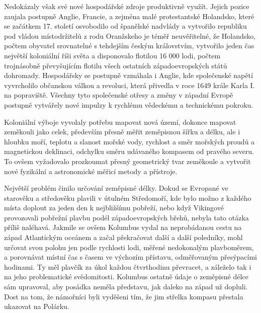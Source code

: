       Nedokázaly však své nové hospodářské zdroje produktivně využít. Jejich pozice zaujala postupně
      Anglie, Francie, a zejména malé protestantské Holandsko, které se začátkem 17. století
      osvobodilo od španělské nadvlády a vytvořilo republiku pod vládou místodržitelů z rodu
      Oranžskeho je téměř neuvěřitelné, že Holandsko, počtem obyvatel srovnatelné s tehdejším českým
      královstvím, vytvořilo jeden čas největší koloniální říši světa a disponovalo flotilou 16 000
      lodi, počtem trojnásobně převyšujícím flotilu všech ostatních západoevropských států
      dohromady. Hospodářsky se postupně vzmáhala i Anglie, kde společenské napětí vyvrcholilo
      občanskou válkou a revoluci, která přivedla v roce 1649 krále Karla I. na popraviště. Všechny
      tyto společenské otřesy a změny v západní Evropě postupně vytvářely nové impulzy k rychlému
      vědeckému a technickému pokroku.

      Koloniální výboje vyvolaly potřebu mapovat nová území, dokonce mapovat zeměkouli jako celek,
      především přesně měřit zeměpisnou šířku a délku, ale i hloubku moří, teplotu a slanost mořské
      vody, rychlost a směr mořských proudů a magnetickou deklinaci, odchylku směru udávaného
      kompasem od pravého severu. To ovšem vyžadovalo prozkoumat přesný geometrický tvar zeměkoule a
      vytvořit nové fyzikální a astronomické měřicí metody a přístroje.

      Největší problém činilo určování zeměpisné délky. Dokud se Evropané ve starověku a středověku
      plavili v útulném Středomoří, kde bylo možno z každého místa doplout za jeden den k
      nejbližšímu pobřeží, nebo když Vikingové provozovali pobřežní plavbu podél západoevropských
      břehů, nebyla tato otázka příliš naléhavá. Jakmile se ovšem Kolumbus vydal na neprobádanou
      cestu na západ Atlantickým oceánem a začal překračovat další a další poledníky, mohl určovat
      svou polohu jen podle rychlosti lodi, měřené nedokonalým plavboměrem, a porovnávat místní čas
      s časem ve výchozím přístavu, odměřovaným přesýpacími hodinami. Ty měl plavčík za úkol každou
      čtvrthodinu převracet, a záleželo tak i na jeho problematické svědomitosti. Kolumbus ostatně
      údaje o zeměpisné délce sám upravoval, aby posádka neměla představu, jak daleko na západ už
      dopluli. Dost na tom, že námořníci byli vyděšeni tím, že jim střelka kompasu přestala ukazovat
      na Polárku.

